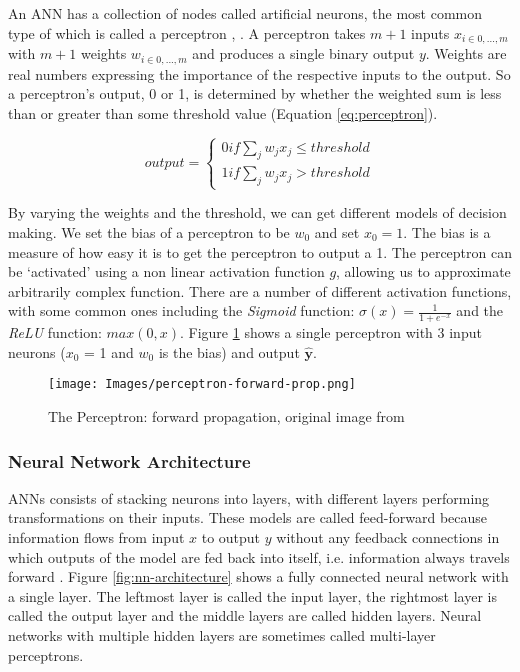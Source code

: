 \documentclass[12pt, a4paper]{article}
\begin{document}
An ANN has a collection of nodes called artificial neurons, the most common type of which is called a perceptron \cite{methods-for-ds-slides}, \cite{neural-networks-book}. A perceptron takes $m + 1$ inputs $x_{i\in{0,...,m}}$ with $m + 1$ weights $w_{i\in{0,...,m}}$ and produces a single binary output $y$. Weights are real numbers expressing the importance of the respective inputs to the output. So a perceptron's output, 0 or 1, is determined by whether the weighted sum is less than or greater than some threshold value (Equation \ref{eq:perceptron}).

\begin{equation}
    output = 
    \begin{cases} 
        0 if \sum_jw_jx_j \leqslant threshold \\
        1 if \sum_jw_jx_j > threshold
    \end{cases}
    \label{eq:perceptron}
\end{equation}

By varying the weights and the threshold, we can get different models of decision making. We set the bias of a perceptron to be $w_0$ and set $x_0 = 1$. The bias is a measure of how easy it is to get the perceptron to output a 1. The perceptron can be `activated' using a non linear activation function $g$, allowing us to approximate arbitrarily complex function. There are a number of different activation functions, with some common ones including the \textit{Sigmoid} function: $ \sigma(x) = \frac{1}{1 + e^{-x}} $ and the \textit{ReLU} function: $ max(0, x) $. Figure \ref{fig:perceptron} shows a single perceptron with 3 input neurons ($x_0$ = 1 and $w_0$ is the bias) and output $\mathbf{\hat y}$.

\begin{figure}[H]
\begin{center}
    \texttt{[image: Images/perceptron-forward-prop.png]}
    \caption{The Perceptron: forward propagation, original image from \cite{methods-for-ds-slides}}
    \label{fig:perceptron}
\end{center}
\end{figure}

\subsubsection{Neural Network Architecture}

ANNs consists of stacking neurons into layers, with different layers performing transformations on their inputs. These models are called feed-forward because information flows from input $x$ to output $y$ without any feedback connections in which outputs of the model are fed back into itself, i.e. information always travels forward \cite{deep-learning-book}. Figure \ref{fig:nn-architecture} shows a fully connected neural network with a single layer. The leftmost layer is called the input layer, the rightmost layer is called the output layer and the middle layers are called hidden layers. Neural networks with multiple hidden layers are sometimes called multi-layer perceptrons.
\end{document}
